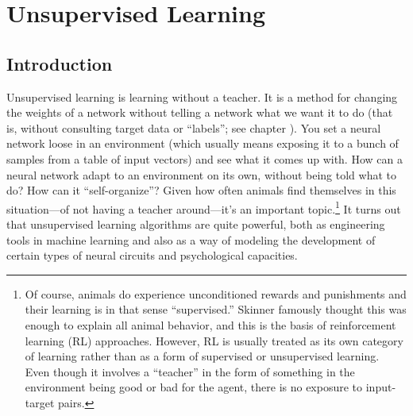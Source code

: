 \chapter{Unsupervised Learning}\label{ch_unsupervised}

\section{Introduction}


Unsupervised learning is learning without a teacher. It is a method for changing the weights of a network without telling a network what we want it to do (that is, without consulting target data or ``labels''; see chapter ). You set a neural network loose in an environment (which usually means exposing it to a bunch of samples from a table of input vectors) and see what it comes up with. How can a neural network adapt to an environment on its own, without being told what to do?  How can it ``self-organize''? Given how often animals find themselves in this situation---of not having a teacher around---it's an important topic.\footnote{Of course, animals do experience unconditioned rewards and punishments and their learning is in that sense ``supervised.'' Skinner famously thought this was enough to explain all animal behavior, and this is the basis of reinforcement learning (RL) approaches. However, RL is usually treated as its own category of learning rather than as a form of supervised or unsupervised learning. Even though it involves a ``teacher''  in the form of something in the environment being good or bad for the agent, there is no exposure to input-target pairs.} It turns out that unsupervised learning algorithms are quite powerful, both as engineering tools in machine learning and also as a way of modeling the development of certain types of neural circuits and psychological capacities.

